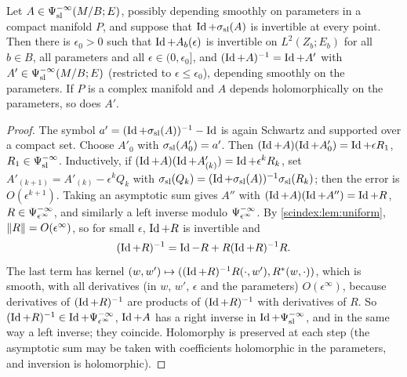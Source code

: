 \begin{lemma}[Invertibility]\label{scindex:lem:invertible}
  Let $A\in\Psi^{-\infty}_{\mathrm{sl}}(M/B;E)$, possibly depending smoothly on parameters
  in a compact manifold $P$, and suppose that $\operatorname{Id}+\sigma_{\mathrm{sl}}(A)$ is invertible at
  every point. Then there is $\epsilon_0>0$ such that $\operatorname{Id}+A_b(\epsilon)$ is
  invertible on $L^2(Z_b;E_b)$ for all $b\in B$, all parameters and all
  $\epsilon\in(0,\epsilon_0]$, and $(\operatorname{Id}+A)^{-1}=\operatorname{Id}+A'$ with
  $A'\in\Psi^{-\infty}_{\mathrm{sl}}(M/B;E)$ (restricted to $\epsilon\le\epsilon_0$),
  depending smoothly on the parameters. If $P$ is a complex manifold and $A$
  depends holomorphically on the parameters, so does $A'$.
\end{lemma}
\begin{proof}
  The symbol $a'=(\operatorname{Id}+\sigma_{\mathrm{sl}}(A))^{-1}-\operatorname{Id}$ is again Schwartz and supported over a
  compact set. Choose $A'_0$ with $\sigma_{\mathrm{sl}}(A'_0)=a'$. Then
  $(\operatorname{Id}+A)(\operatorname{Id}+A'_0)=\operatorname{Id}+\epsilon R_1$, $R_1\in\Psi^{-\infty}_{\mathrm{sl}}$. Inductively, if
  $(\operatorname{Id}+A)(\operatorname{Id}+A'_{(k)})=\operatorname{Id}+\epsilon^kR_k$, set
  $A'_{(k+1)}=A'_{(k)}-\epsilon^kQ_k$ with $\sigma_{\mathrm{sl}}(Q_k)=(\operatorname{Id}+\sigma_{\mathrm{sl}}(A))^{-1}
  \sigma_{\mathrm{sl}}(R_k)$; then the error is $O(\epsilon^{k+1})$. Taking an asymptotic sum
  gives $A''$ with $(\operatorname{Id}+A)(\operatorname{Id}+A'')=\operatorname{Id}+R$, $R\in\Psi^{-\infty}_{\epsilon^\infty}$, and similarly a
  left inverse modulo $\Psi^{-\infty}_{\epsilon^\infty}$. By \cref{scindex:lem:uniform},
  $\lVert R\rVert=O(\epsilon^\infty)$, so for small $\epsilon$, $\operatorname{Id}+R$ is invertible
  and
  \begin{equation*}
    (\operatorname{Id}+R)^{-1}=\operatorname{Id}-R+R(\operatorname{Id}+R)^{-1}R.
  \end{equation*}
  The last term has kernel $(w,w')\mapsto( (\operatorname{Id}+R)^{-1}R(\cdot,w'), R^*(w,\cdot))$, which is smooth, with all derivatives (in $w$, $w'$,
  $\epsilon$ and the parameters) $O(\epsilon^\infty)$, because derivatives of
  $(\operatorname{Id}+R)^{-1}$ are products of $(\operatorname{Id}+R)^{-1}$ with derivatives of $R$. So
  $(\operatorname{Id}+R)^{-1}\in\operatorname{Id}+\Psi^{-\infty}_{\epsilon^\infty}$, $\operatorname{Id}+A$ has a right inverse in
  $\operatorname{Id}+\Psi^{-\infty}_{\mathrm{sl}}$, and in the same way a left inverse; they coincide.
  Holomorphy is preserved at each step (the asymptotic sum may be taken with
  coefficients holomorphic in the parameters, and inversion is holomorphic).
\end{proof}

